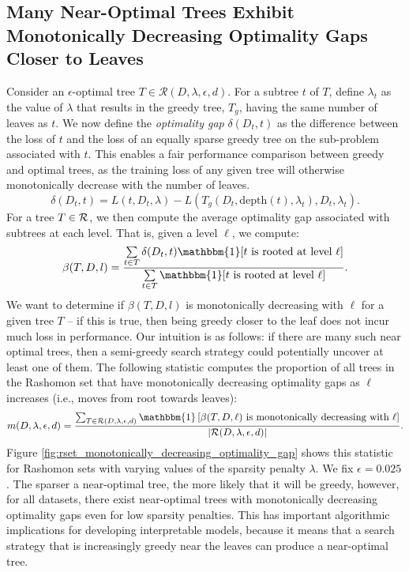 \subsection{Many Near-Optimal Trees Exhibit Monotonically Decreasing Optimality Gaps Closer to Leaves}
\label{sec:near_optimal_monotonic}
Consider an $\epsilon$-optimal tree $T \in \mathcal{R}(D, \lambda, \epsilon, d)$. For a subtree $t$ of $T$, define $\lambda_{t}$ as the value of $\lambda$ that results in the greedy tree, $T_{g}$, having the same number of leaves as $t$. We now define the \textit{optimality gap} $\delta(D_{t}, t)$ as the difference between the loss of $t$ and the loss of an equally sparse greedy tree on the sub-problem associated with $t$. This enables a fair performance comparison between greedy and optimal trees, as the training loss of any given tree will otherwise monotonically decrease with the number of leaves. 
\begin{equation}
    \delta(D_{t}, t) = L(t, D_{t}, \lambda) - L(T_{g}(D_{t}, \text{depth}(t), \lambda_{t}), D_{t},\lambda_t).
\end{equation}
For a tree $T \in \mathcal{R}$, we then compute the average optimality gap associated with subtrees at each level. That is, given a level $\ell$, we compute:
\begin{equation}
   \beta(T, D, l) = \frac{\sum\limits_{\textrm{$t$} \in T }\delta(D_{t}, t)\mathbbm{1}[\textrm{$t$ is rooted at level $\ell$}]}{{\sum\limits_{\textrm{$t$} \in T }\mathbbm{1}[\textrm{$t$ is rooted at level $\ell$}]}}.
\end{equation}
We want to determine if $\beta(T, D, l)$ is monotonically decreasing with $\ell$ for a given tree $T$ -- if this is true, then being greedy closer to the leaf does not incur much loss in performance. Our intuition is as follows: if there are many such near optimal trees, then a semi-greedy search strategy could potentially uncover at least one of them. The following statistic computes the proportion of all trees in the Rashomon set that have monotonically decreasing optimality gaps as $\ell$ increases (i.e., moves from root towards leaves):
\begin{equation}
m(D,\lambda, \epsilon,d) =\frac{
    \sum_{T \in \mathcal{R}(D,\lambda, \epsilon, d)} 
    \mathbbm{1}\left[ \beta(T,D,\ell) 
    \text{ is monotonically decreasing with } \ell \right]
}{|\mathcal{R}(D,\lambda, \epsilon,d)|
}.
\end{equation}
Figure \ref{fig:rset_monotonically_decreasing_optimality_gap} shows this statistic for Rashomon sets with varying values of the sparsity penalty $\lambda$. We fix $\epsilon = 0.025$. The sparser a near-optimal tree, the more likely that it will be greedy, however, for all datasets, there exist near-optimal trees with monotonically decreasing optimality gaps even for low sparsity penalties. This has important algorithmic implications for developing interpretable models, because it means that a search strategy that is increasingly greedy near the leaves can produce a near-optimal tree.

